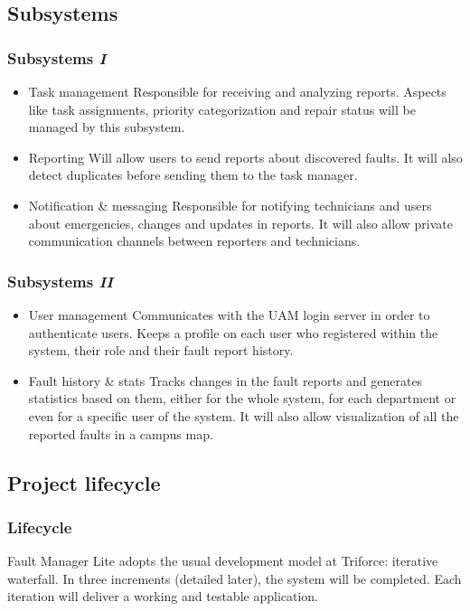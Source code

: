 \documentclass[10pt, compress,usetitleprogressbar,aspectratio=1610]{beamer}
\begin{document}
\subsection{Subsystems}
\begin{frame}
\frametitle{Subsystems \hfill \emph{I}}
\begin{itemize}
\item \alert{Task management} Responsible for receiving and analyzing reports. Aspects like task assignments, priority categorization and repair status will be managed by this subsystem.
\item \alert{Reporting} Will allow users to send reports about discovered faults. It will also detect duplicates before sending them to the task manager.
\item \alert{Notification \& messaging} Responsible for notifying technicians and users about emergencies, changes and updates in reports. It will also allow private communication channels between reporters and technicians.
\end{itemize}
\end{frame}

\begin{frame}
\frametitle{Subsystems \hfill \emph{II}}
\begin{itemize}
\item \alert{User management} Communicates with the UAM login server in order to authenticate users. Keeps a profile on each user who registered within the system, their role and their fault report history.
\item \alert{Fault history \& stats} Tracks changes in the fault reports and generates statistics based on them, either for the whole system, for each department or even for a specific user of the system. It will also allow visualization of all the reported faults in a campus map.
\end{itemize}
\end{frame}

\subsection{Project lifecycle}
\begin{frame}
\frametitle{Lifecycle}

Fault Manager Lite adopts the usual development model at Triforce: iterative waterfall. In three increments (detailed later), the system will be completed. Each iteration will deliver a working and testable application.
\end{frame}
\end{document}
